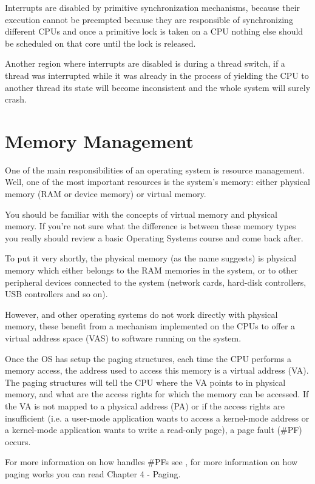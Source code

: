 \begin{appendices}
Interrupts are disabled by primitive synchronization mechanisms, because their execution cannot be
preempted because they are responsible of synchronizing different CPUs and once a primitive lock is
taken on a CPU nothing else should be scheduled on that core until the lock is released.

Another region where interrupts are disabled is during a thread switch, if a thread was interrupted
while it was already in the process of yielding the CPU to another thread its state will become
inconsistent and the whole system will surely crash.

\section{Memory Management}
\label{sect:MemManagement}

One of the main responsibilities of an operating system is resource management. Well, one of the
most important resources is the system's memory: either physical memory (RAM or device memory) or
virtual memory.

You should be familiar with the concepts of virtual memory and physical memory. If you're not sure
what the difference is between these memory types you really should review a basic Operating Systems
course and come back after.

To put it very shortly, the physical memory (as the name suggests) is physical memory which either
belongs to the RAM memories in the system, or to other peripheral devices connected to the system
(network cards, hard-disk controllers, USB controllers and so on).

However, \projectname and other operating systems do not work directly with physical memory, these
benefit from a mechanism implemented on the CPUs to offer a virtual address space (VAS) to software
running on the system.

Once the OS has setup the paging structures, each time the CPU performs a memory access, the address
used to access this memory is a virtual address (VA). The paging structures will tell the CPU
where the VA points to in physical memory, and what are the access rights for which the memory can
be accessed. If the VA is not mapped to a physical address (PA) or if the access rights are
insufficient (i.e. a user-mode application wants to access a kernel-mode address or a kernel-mode
application wants to write a read-only page), a page fault (\#PF) occurs.

For more information on how \projectname handles \#PFs see , for more
information on how paging works you can read \cite{intelSys} Chapter 4 - Paging.


\end{appendices}
